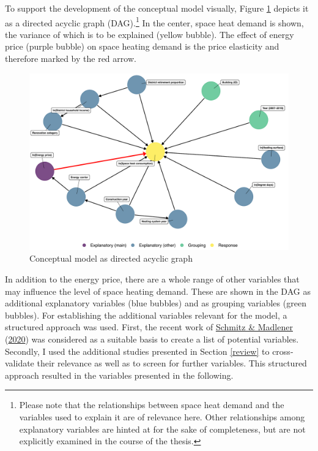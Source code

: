 \documentclass[12pt,twoside]{reedthesis}
\begin{document}
To support the development of the conceptual model visually, Figure \ref{fig:dag} depicts it as a directed acyclic graph (DAG).\footnote{Please note that the relationships between space heat demand and the variables used to explain it are of relevance here. Other relationships among explanatory variables are hinted at for the sake of completeness, but are not explicitly examined in the course of the thesis.} In the center, space heat demand is shown, the variance of which is to be explained (yellow bubble). The effect of energy price (purple bubble) on space heating demand is the price elasticity and therefore marked by the red arrow.
\begin{figure}

{\centering \includegraphics[width=1\linewidth]{figure/conceptual_dag_red} 

}

\caption[Conceptual model as directed acyclic graph]{Conceptual model as directed acyclic graph}\label{fig:dag}
\end{figure}
In addition to the energy price, there are a whole range of other variables that may influence the level of space heating demand. These are shown in the DAG as additional explanatory variables (blue bubbles) and as grouping variables (green bubbles). For establishing the additional variables relevant for the model, a structured approach was used. First, the recent work of \protect\hyperlink{ref-schmitz_madlener20}{Schmitz \& Madlener} (\protect\hyperlink{ref-schmitz_madlener20}{2020}) was considered as a suitable basis to create a list of potential variables. Secondly, I used the additional studies presented in Section \ref{review} to cross-validate their relevance as well as to screen for further variables. This structured approach resulted in the variables presented in the following.
\end{document}
